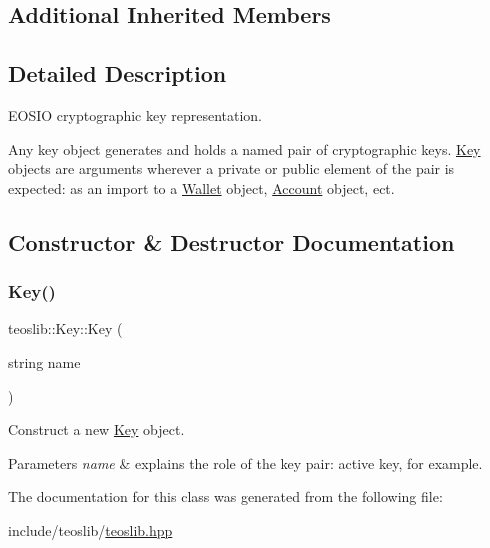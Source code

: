 \subsection*{Additional Inherited Members}


\subsection{Detailed Description}
E\+O\+S\+IO cryptographic key representation. 

Any key object generates and holds a named pair of cryptographic keys. \mbox{\hyperlink{classteoslib_1_1_key}{Key}} objects are arguments wherever a private or public element of the pair is expected\+: as an import to a \mbox{\hyperlink{classteoslib_1_1_wallet}{Wallet}} object, \mbox{\hyperlink{classteoslib_1_1_account}{Account}} object, ect. 

\subsection{Constructor \& Destructor Documentation}
\mbox{\label{classteoslib_1_1_key_a7c296035add9fcd2fee9fbbf118df3a7}} 
\subsubsection{\texorpdfstring{Key()}{Key()}}
{\footnotesize\ttfamily teoslib\+::\+Key\+::\+Key (\begin{DoxyParamCaption}\item[{string}]{name }\end{DoxyParamCaption})\hspace{0.3cm}{\ttfamily [inline]}}



Construct a new \mbox{\hyperlink{classteoslib_1_1_key}{Key}} object. 


\begin{DoxyParams}{Parameters}
{\em name} & explains the role of the key pair\+: {\ttfamily active key}, for example. \\
\hline
\end{DoxyParams}


The documentation for this class was generated from the following file\+:\begin{DoxyCompactItemize}
\item 
include/teoslib/\mbox{\hyperlink{teoslib_8hpp}{teoslib.\+hpp}}\end{DoxyCompactItemize}
